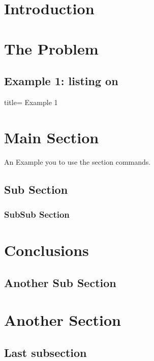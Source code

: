 \documentclass{scrartcl}
\newcounter{oldsection}%
\begin{document}
    \tableofcontents
    \section{Introduction}
    \section{The Problem}
    \subsection{Example 1: listing on}
    
    \setcounter{oldsection}{\thesection} %
    \addtocounter{section}{-\thesection} %

    \begin{tcblisting}{title= Example 1}
\section{Main Section} 

An Example you to use the section commands.

    \subsection{Sub Section} 
        \subsubsection{SubSub Section} 

\section{Conclusions}
    \subsection{Another Sub Section} 
    \end{tcblisting}

    \setcounter{section}{\theoldsection} %
    
    \section{Another Section}  
    \subsection{Last subsection} 
\end{document}
